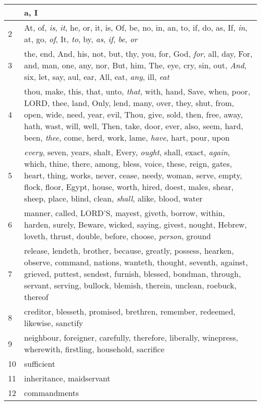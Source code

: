 \begin{longtable}{l|p{3.75in}}
\hline \hline
\endlastfoot
1 & a, I \\ \hline
2 & At, of, \emph{is}, \emph{it}, he, or, it, is, Of, be, no, in, an, to, if, do, as, If, \emph{in}, at, go, \emph{of}, It, \emph{to}, by, \emph{as}, \emph{if}, \emph{be}, \emph{or} \\ \hline
3 & the, end, And, his, not, but, thy, you, for, God, \emph{for}, all, day, For, and, man, one, any, nor, But, him, The, eye, cry, sin, out, \emph{And}, six, let, say, aul, ear, All, eat, \emph{any}, ill, \emph{eat} \\ \hline
4 & thou, make, this, that, unto, \emph{that}, with, hand, Save, when, poor, LORD, thee, land, Only, lend, many, over, they, shut, from, open, wide, need, year, evil, Thou, give, sold, then, free, away, hath, wast, will, well, Then, take, door, ever, also, seem, hard, been, \emph{thee}, come, herd, work, lame, \emph{have}, hart, pour, upon \\ \hline
5 & \emph{every}, seven, years, shalt, Every, \emph{ought}, shall, exact, \emph{again}, which, thine, there, among, bless, voice, these, reign, gates, heart, thing, works, never, cease, needy, woman, serve, empty, flock, floor, Egypt, house, worth, hired, doest, males, shear, sheep, place, blind, clean, \emph{shall}, alike, blood, water \\ \hline
6 & manner, called, LORD'S, mayest, giveth, borrow, within, harden, surely, Beware, wicked, saying, givest, nought, Hebrew, loveth, thrust, double, before, choose, \emph{person}, ground \\ \hline
7 & release, lendeth, brother, because, greatly, possess, hearken, observe, command, nations, wanteth, thought, seventh, against, grieved, puttest, sendest, furnish, blessed, bondman, through, servant, serving, bullock, blemish, therein, unclean, roebuck, thereof \\ \hline
8 & creditor, blesseth, promised, brethren, remember, redeemed, likewise, sanctify \\ \hline
9 & neighbour, foreigner, carefully, therefore, liberally, winepress, wherewith, firstling, household, sacrifice \\ \hline
10 & sufficient \\ \hline
11 & inheritance, maidservant \\ \hline
12 & commandments \\ \hline
\end{longtable}






 